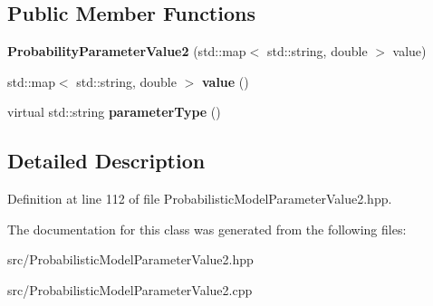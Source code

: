 \subsection*{Public Member Functions}
\begin{DoxyCompactItemize}
\item 
\mbox{\label{classtops_1_1ProbabilityParameterValue2_a990c19910351bb38b3a30cd861c28fca}} 
{\bfseries Probability\+Parameter\+Value2} (std\+::map$<$ std\+::string, double $>$ value)
\item 
\mbox{\label{classtops_1_1ProbabilityParameterValue2_a1a4b0c0cafb618f067e933f5d3c1b497}} 
std\+::map$<$ std\+::string, double $>$ {\bfseries value} ()
\item 
\mbox{\label{classtops_1_1ProbabilityParameterValue2_a3a714270a8d999f865e434581adb1752}} 
virtual std\+::string {\bfseries parameter\+Type} ()
\end{DoxyCompactItemize}


\subsection{Detailed Description}


Definition at line 112 of file Probabilistic\+Model\+Parameter\+Value2.\+hpp.



The documentation for this class was generated from the following files\+:\begin{DoxyCompactItemize}
\item 
src/Probabilistic\+Model\+Parameter\+Value2.\+hpp\item 
src/Probabilistic\+Model\+Parameter\+Value2.\+cpp\end{DoxyCompactItemize}
